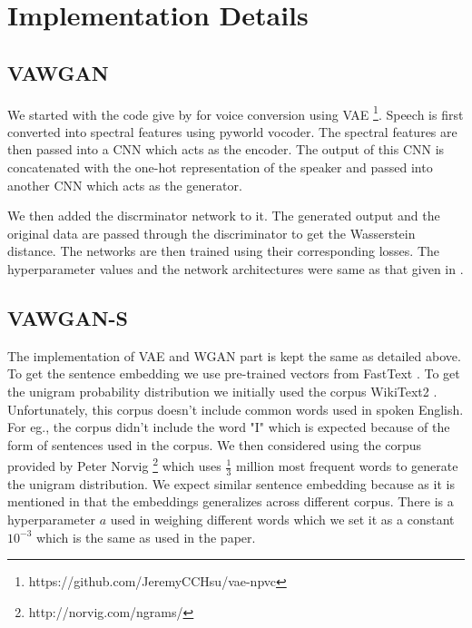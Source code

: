 \documentclass[letterpaper]{article}
\begin{document}
\section{Implementation Details}
\subsection{VAWGAN}
We started with the code give by \cite{vae} for voice conversion using VAE \footnote{https://github.com/JeremyCCHsu/vae-npvc}. Speech is first converted into spectral features using pyworld vocoder. The spectral features are then passed into a CNN which acts as the encoder. The output of this CNN is concatenated with the one-hot representation of the speaker and passed into another CNN which acts as the generator. 

We then added the discrminator network to it. The generated output and the original data are passed through the discriminator to get the Wasserstein distance. The networks are then trained using their corresponding losses. The hyperparameter values and the network architectures were same as that given in \cite{vawgan}.
\subsection{VAWGAN-S}
The implementation of VAE and WGAN part is kept the same as detailed above. To get the sentence embedding we use pre-trained vectors from FastText \cite{bojanowski2016enriching}. To get the unigram probability distribution we initially used the corpus WikiText2 \cite{DBLP:journals/corr/MerityXBS16}. Unfortunately, this corpus doesn't include common words used in spoken English. For eg., the corpus didn't include the word "I" which is expected because of the form of sentences used in the corpus. We then considered using the corpus provided by Peter Norvig \footnote{http://norvig.com/ngrams/} which uses $\frac{1}{3}$ million most frequent words to generate the unigram distribution. We expect similar sentence embedding because as it is mentioned in \cite{arora2017asimple} that the embeddings generalizes across different corpus. There is a hyperparameter $a$ used in weighing different words which we set it as a constant $10^{-3}$ which is the same as used in the paper. 
\end{document}
